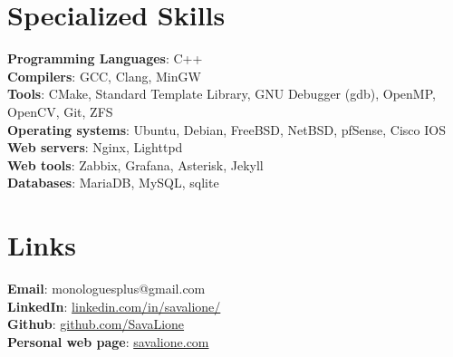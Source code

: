 \documentclass[letterpaper,11pt]{article}
\begin{document}
\section{Specialized Skills}
\begin{itemize}[leftmargin=0.15in, label={}]
    \normalsize{\item{
                    \textbf{Programming Languages}{: C++} \\
                    \textbf{Compilers}{: GCC, Clang, MinGW}\\
                    \textbf{Tools}{: CMake, Standard Template Library, GNU Debugger (gdb), OpenMP, OpenCV, Git, ZFS} \\
                    \textbf{Operating systems}{: Ubuntu, Debian, FreeBSD, NetBSD, pfSense, Cisco IOS} \\
                    \textbf{Web servers}{: Nginx, Lighttpd} \\
                    \textbf{Web tools}{: Zabbix, Grafana, Asterisk, Jekyll} \\
                    \textbf{Databases}{: MariaDB, MySQL, sqlite} \\
              }}
\end{itemize}


\section{Links}
\begin{itemize}[leftmargin=0.15in, label={}]
    \normalsize{\item{
                    \textbf{Email}{:  monologuesplus@gmail.com} \\
                    \textbf{LinkedIn}{:  \href{https://linkedin.com/in/savalione/}{linkedin.com/in/savalione/}} \\
                    \textbf{Github}{:  \href{https://github.com/SavaLione}{github.com/SavaLione}} \\
                    \textbf{Personal web page}{: \href{https://savalione.com}{savalione.com} } \\
              }}
\end{itemize}
\end{document}
